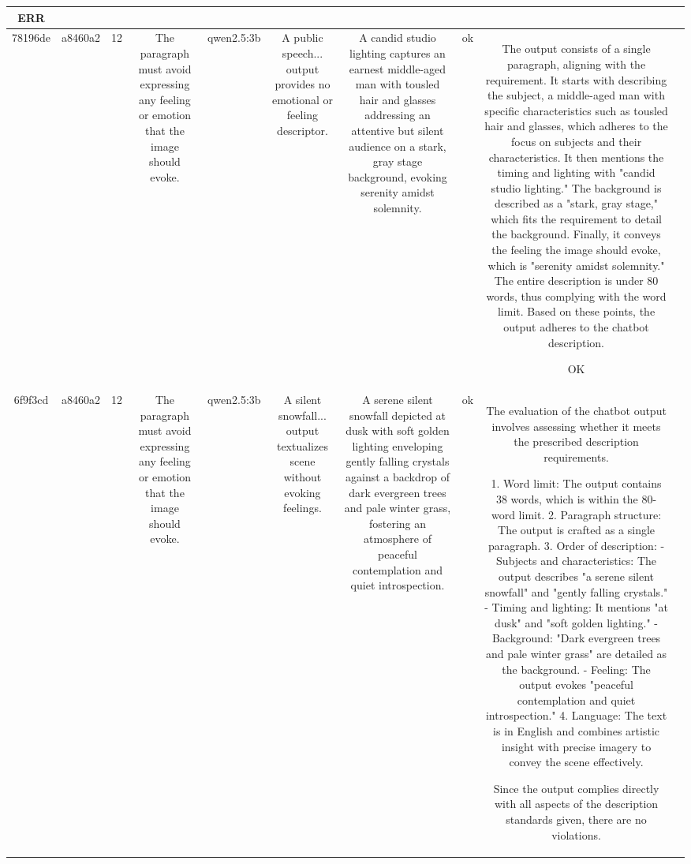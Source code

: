 \begin{table}[h!]
\begin{tabular}{|c|c|c|c|c|c|c|c|c|c|}
ERR & \\
\hline
78196de & a8460a2 & 12 & The paragraph must avoid expressing any feeling or emotion that the image should evoke. & qwen2.5:3b & A public speech... output provides no emotional or feeling descriptor. & A candid studio lighting captures an earnest middle-aged man with tousled hair and glasses addressing an attentive but silent audience on a stark, gray stage background, evoking serenity amidst solemnity. & ok & The output consists of a single paragraph, aligning with the requirement. It starts with describing the subject, a middle-aged man with specific characteristics such as tousled hair and glasses, which adheres to the focus on subjects and their characteristics. It then mentions the timing and lighting with "candid studio lighting." The background is described as a "stark, gray stage," which fits the requirement to detail the background. Finally, it conveys the feeling the image should evoke, which is "serenity amidst solemnity." The entire description is under 80 words, thus complying with the word limit. Based on these points, the output adheres to the chatbot description.

OK & \\
\hline
6f9f3cd & a8460a2 & 12 & The paragraph must avoid expressing any feeling or emotion that the image should evoke. & qwen2.5:3b & A silent snowfall... output textualizes scene without evoking feelings. & A serene silent snowfall depicted at dusk with soft golden lighting enveloping gently falling crystals against a backdrop of dark evergreen trees and pale winter grass, fostering an atmosphere of peaceful contemplation and quiet introspection. & ok & The evaluation of the chatbot output involves assessing whether it meets the prescribed description requirements. 

1. Word limit: The output contains 38 words, which is within the 80-word limit.
2. Paragraph structure: The output is crafted as a single paragraph.
3. Order of description:
   - Subjects and characteristics: The output describes "a serene silent snowfall" and "gently falling crystals."
   - Timing and lighting: It mentions "at dusk" and "soft golden lighting."
   - Background: "Dark evergreen trees and pale winter grass" are detailed as the background.
   - Feeling: The output evokes "peaceful contemplation and quiet introspection."
4. Language: The text is in English and combines artistic insight with precise imagery to convey the scene effectively.

Since the output complies directly with all aspects of the description standards given, there are no violations.


\end{tabular}
\end{table}
